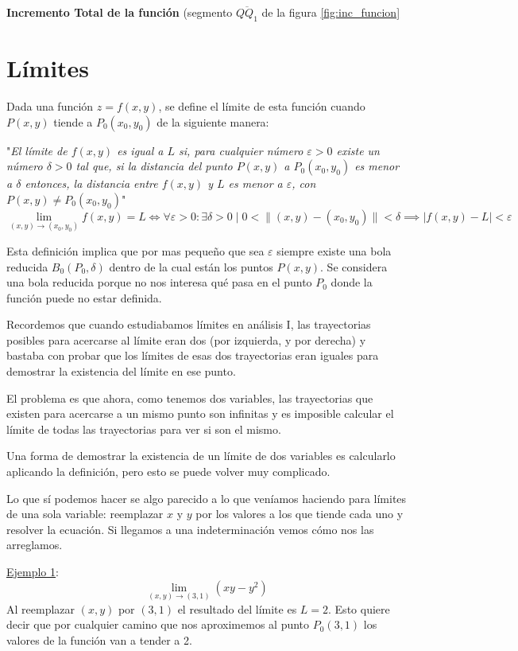 \documentclass[12pt]{article}
\begin{document}
\textbf{Incremento Total de la función} (segmento $ \overline{QQ_{1}} $ de la figura \ref{fig:inc_funcion}

\section{Límites}
Dada una función $ z = f(x,y) $, se define el límite de esta función cuando $ P(x,y) $ tiende a $ P_{0}(x_{0},y_{0}) $ de la siguiente manera:

"\textit{El límite de $ f(x,y) $ es igual a $ L $ si, para cualquier número $ \varepsilon > 0 $ existe un número $ \delta > 0 $ tal que, si la distancia del punto $ P(x,y) $ a $ P_{0}(x_{0},y_{0}) $ es menor a $ \delta $ entonces, la distancia entre $ f(x,y) $ y $ L $ es menor a $ \varepsilon $, con $ P(x,y) \neq P_{0}(x_{0},y_{0}) $}"
\[
	\lim_{(x,y) \to (x_{0},y_{0})}{f(x,y)} = L \iff \forall \varepsilon > 0 : \exists \delta > 0 \mid 0 < \lVert(x,y) - (x_{0},y_{0})\rVert < \delta \implies \left|f(x,y) - L\right| < \varepsilon
\]

Esta definición implica que por mas pequeño que sea $ \varepsilon{} $ siempre existe una bola reducida $ B_{0}(P_{0},\delta) $ dentro de la cual están los puntos $ P(x,y) $. Se considera una bola reducida porque no nos interesa qué pasa en el punto $ P_{0} $ donde la función puede no estar definida.

Recordemos que cuando estudiabamos límites en análisis I, las trayectorias posibles para acercarse al límite eran dos (por izquierda, y por derecha) y bastaba con probar que los límites de esas dos trayectorias eran iguales para demostrar la existencia del límite en ese punto.

El problema es que ahora, como tenemos dos variables, las trayectorias que existen para acercarse a un mismo punto son infinitas y es imposible calcular el límite de todas las trayectorias para ver si son el mismo.

Una forma de demostrar la existencia de un límite de dos variables es calcularlo aplicando la definición, pero esto se puede volver muy complicado.

Lo que sí podemos hacer se algo parecido a lo que veníamos haciendo para límites de una sola variable: reemplazar $ x $ y $ y $ por los valores a los que tiende cada uno y resolver la ecuación. Si llegamos a una indeterminación vemos cómo nos las arreglamos.

\underline{Ejemplo 1}:
\[
	\lim_{(x,y) \to (3,1)}{\left(xy - y^{2}\right)}
\]
Al reemplazar $ (x,y) $ por $ (3,1) $ el resultado del límite es $ L = 2 $. Esto quiere decir que por cualquier camino que nos aproximemos al punto $ P_{0}(3,1) $ los valores de la función van a tender a 2.
\end{document}
